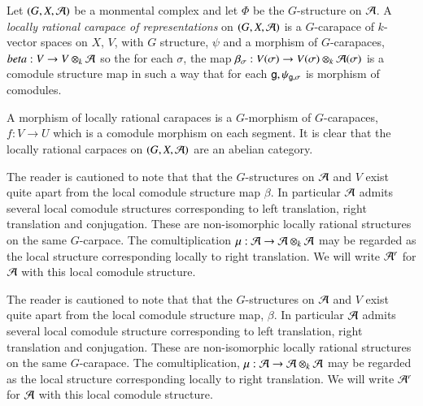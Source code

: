 \begin{definition}
Let $(G, X, \mathcal{A})$ be a monmental complex and let $\Phi$ be the $G$-structure on $\mathcal{A}$. A \textit{locally rational carapace of representations} on $(G, X, \mathcal{A})$ is a $G$-carapace of $k$-vector spaces on $X$, $V$, with $G$ structure, $\psi$ and a morphism of $G$-carapaces, $beta : V \rightarrow V \otimes_{k}\mathcal{A}$ so the for each $\sigma$, the map $\beta_{\sigma} : V(\sigma) \rightarrow V(\sigma)\otimes_{k}\mathcal{A}(\sigma)$ is a comodule structure map in such a way that for each $\mathsf{g}, \psi_{\mathsf{g}, \sigma}$ is morphism of comodules.
\end{definition}

A morphism of locally rational carapaces is a $G$-morphism of $G$-carapaces, $f : V\rightarrow U$ which is a comodule morphism on each segment. It is clear that the locally rational carpaces on $(G, X, \mathcal{A})$ are an abelian category.

The reader is cautioned to note that that the $G$-structures on $\mathcal{A}$ and $V$ exist quite apart from the local comodule structure map $\beta$. In particular $\mathcal{A}$ admits several local comodule structures corresponding to left translation,  right translation and conjugation. These are non-isomorphic locally rational structures on the same $G$-carpace. The comultiplication $\mu : \mathcal{A} \rightarrow \mathcal{A}\otimes_{k}\mathcal{A}$ may be regarded as the local structure corresponding locally to right translation. We will write $\mathcal{A}^{r}$ for $\mathcal{A}$ with this local comodule structure. 

The reader is cautioned to note that that the $G$-structures on $\mathcal{A}$ and $V$ exist quite apart from the local comodule structure map, $\beta$. In particular $\mathcal{A}$ admits several local comodule structure corresponding to left translation, right translation and conjugation. These are non-isomorphic locally rational structures on the same $G$-carapace. The comultiplication, $\mu :\mathcal{A} \rightarrow \mathcal{A} \otimes_{k} \mathcal{A}$ may be regarded as the local structure corresponding locally to right translation. We will write $\mathcal{A}^{r}$ for $\mathcal{A}$ with this local comodule structure.


